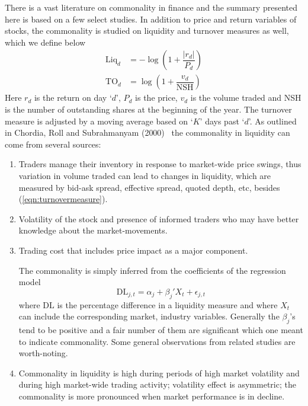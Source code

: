 There is a vast literature on commonality in finance and the summary presented here is based on a few select studies. In addition to price and return variables of stocks, the commonality is studied on liquidity and turnover measures as well, which we define below
	\begin{equation}\label{eqn:turnovermeasure}
	\begin{split}
	\text{Liq}_d&= - \log \left( 1 + \dfrac{|r_d|}{P_d} \right) \\
	\text{TO}_d&= \log \left( 1 + \dfrac{v_d}{\text{NSH}}\right)
	\end{split}
	\end{equation}
Here $r_d$ is the return on day `$d$', $P_d$ is the price, $v_d$ is the volume traded and NSH is the number of outstanding shares at the beginning of the year. The turnover measure is adjusted by a moving average based on `$K$' days past `$d$'. As outlined in Chordia, Roll and Subrahmanyam (2000)~\cite{chordia} the commonality in liquidity can come from several sources: 
	\begin{enumerate}[--]
	\item Traders manage their inventory in response to market-wide price swings, thus variation in volume traded can lead to changes in liquidity, which are measured by bid-ask spread, effective spread, quoted depth, etc, besides (\ref{eqn:turnovermeasure}).
	\item Volatility of the stock and presence of informed traders who may have better knowledge about the market-movements. 
	\item Trading cost that includes price impact as a major component. 
	
	The commonality is simply inferred from the coefficients of the regression model
		\begin{equation}\label{eqn:coefficreg}
		\text{DL}_{j,t}= \alpha_j + \beta_j' X_t + \epsilon_{j,t}
		\end{equation}
	where $\text{DL}$ is the percentage difference in a liquidity measure and where $X_t$ can include the corresponding market, industry variables. Generally the $\beta_j$'s tend to be positive and a fair number of them are significant which one meant to indicate commonality. Some general observations from related studies are worth-noting. 
	\item Commonality in liquidity is high during periods of high market volatility and during high market-wide trading activity; volatility effect is asymmetric; the commonality is more pronounced when market performance is in decline. 
	\end{enumerate}


